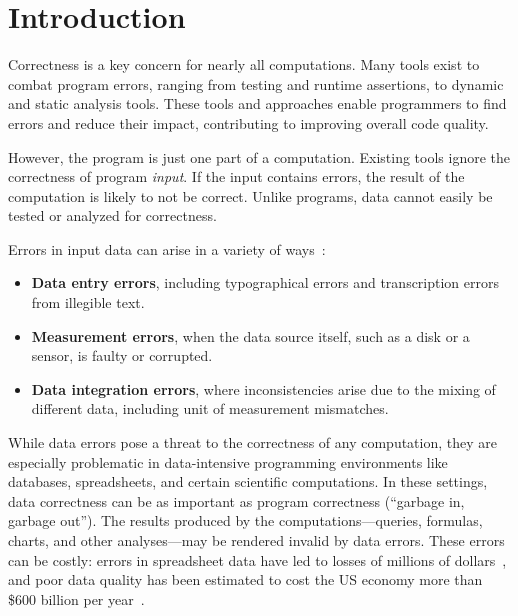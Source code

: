 \section{Introduction}
\label{sec:introduction}

Correctness is a key
concern for nearly all computations. Many tools exist to combat program errors, ranging from testing and
runtime assertions, to dynamic and static analysis tools. 
These tools and approaches enable programmers to find errors and
reduce their impact, contributing to improving overall code quality.


However, the program is just one part of a computation. Existing tools ignore the correctness of program \emph{input}. If the input contains errors, the
result of the computation is likely to not be correct. Unlike
programs, data cannot easily be tested or analyzed for correctness.

Errors in input data
can arise in a variety of ways~\cite{hellerstein2008quantitative}:

\begin{itemize}

\item {\bf Data entry errors}, including typographical errors and transcription errors from illegible text.

\item {\bf Measurement errors}, when the data source itself, such as a disk or a sensor, is faulty or corrupted.

\item {\bf Data integration errors}, where inconsistencies arise due to the mixing of different data, including unit of measurement mismatches.

\end{itemize}


While data errors pose a threat to the correctness of any computation,
they are especially problematic in data-intensive programming
environments like databases, spreadsheets, and certain scientific
computations. In these settings, data correctness can be as important
as program correctness (``garbage in, garbage out''). The results
produced by the computations---queries, formulas, charts, and other
analyses---may be rendered invalid by data errors. These errors can be
costly: errors in spreadsheet data have led to losses of millions of
dollars~\cite{DBLP:journals/corr/abs-0803-2527,sakalerrors}, and poor
data quality has been estimated to cost the US economy more than \$600
billion per year~\cite{eckerson2002}.

